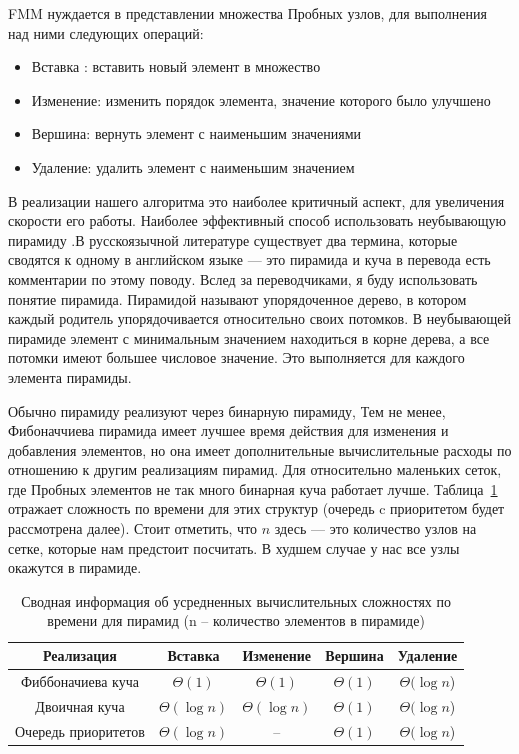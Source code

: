FMM нуждается в представлении множества Пробных узлов, для
выполнения над ними следующих операций:
\begin{itemize}
\item Вставка : вставить новый элемент в множество
\item Изменение: изменить порядок элемента, значение которого было
  улучшено
\item Вершина: вернуть элемент с наименьшим значениями
\item Удаление: удалить элемент с наименьшим значением 
\end{itemize}
В реализации нашего алгоритма это наиболее критичный аспект, для
увеличения скорости его работы. Наиболее эффективный способ
использовать неубывающую пирамиду \cite{TK2017}.В русскоязычной
литературе существует два термина, которые сводятся к одному в
английском языке --- это пирамида и куча в перевода \cite{TK2017} есть
комментарии по этому поводу. Вслед за переводчиками, я буду
использовать понятие пирамида. Пирамидой называют упорядоченное дерево,
в котором каждый родитель упорядочивается относительно своих потомков. В
неубывающей пирамиде элемент с минимальным значением находиться в
корне дерева, а все потомки имеют большее числовое значение. Это
выполняется для каждого элемента пирамиды.

Обычно пирамиду реализуют через бинарную пирамиду, Тем не менее,
Фибоначчиева пирамида \cite{F1987} имеет лучшее время действия для
изменения и добавления элементов, но она имеет дополнительные
вычислительные расходы по отношению к другим реализациям пирамид. Для
относительно маленьких сеток, где Пробных элементов не так много
бинарная куча работает лучше. Таблица~\ref{tab:perf} отражает
сложность по времени для этих структур (очередь c приоритетом будет
рассмотрена далее). Стоит отметить, что $n$ здесь --- это количество
узлов на сетке, которые нам предстоит посчитать. В худшем случае у нас
все узлы окажутся в пирамиде.

\begin{table}
  \centering
  \caption{Сводная информация об усредненных вычислительных
    сложностях по времени для пирамид (n -- количество элементов в
    пирамиде)}
  \label{tab:perf}
  \begin{tabular}{|*{5}{c|}}
    \hline
Реализация & Вставка & Изменение & Вершина & Удаление\\[0.3cm]\hline
Фиббоначиева куча & $\Theta(1)$ & $\Theta(1)$&$\Theta(1)$&$\Theta(\log n$) \\\hline
Двоичная куча & $\Theta(\log n)$ & $\Theta(\log n)$&$\Theta(1)$&$\Theta(\log n$) \\\hline
Очередь приоритетов & $\Theta(\log n)$ & -- &$\Theta(1)$&$\Theta(\log n$) \\\hline
    
  \end{tabular}
\end{table}

